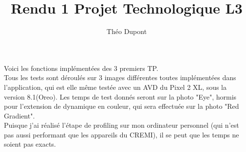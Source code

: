 \documentclass[12pt]{article}
\begin{document}
\title{Rendu 1 Projet Technologique L3}
\author{Théo Dupont}
\maketitle


\bigskip

Voici les fonctions implémentées des 3 premiers TP.\\
Tous les tests sont déroulés sur 3 images différentes toutes implémentées dans l'application, 
qui est elle même testée avec un AVD du Pixel 2 XL, sous la version 8.1(Oreo).
Les temps de test donnés seront sur la photo "Eye", hormis pour l'extension de dynamique en couleur, 
qui sera effectuée sur la photo "Red Gradient".\\
Puisque j'ai réalisé l'étape de profiling sur mon ordinateur personnel (qui n'est pas aussi performant que les appareils du CREMI), il se peut que les temps ne soient pas exacts.\\
\\
\\
\end{document}
